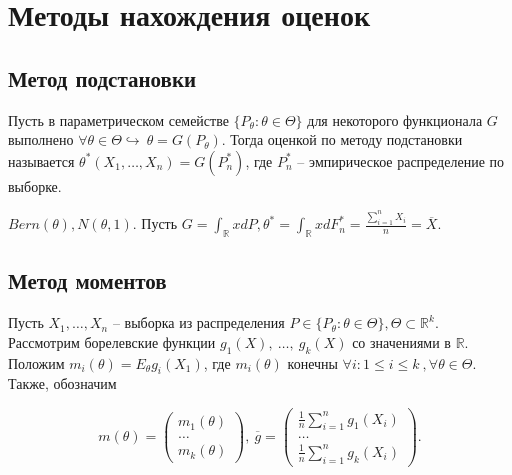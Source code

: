 \section{Методы нахождения оценок}
\subsection{Метод подстановки}
\begin{definition}
Пусть в параметрическом семействе $\displaystyle \{P_{\theta } :\theta \in \Theta \}$ для некоторого функционала $\displaystyle G$ выполнено $\displaystyle \forall \theta \in \Theta \hookrightarrow \ \theta =G( P_{\theta })$. Тогда оценкой по методу подстановки называется $\displaystyle \theta ^{*}( X_{1} ,\dotsc ,X_{n}) =G\left( P_{n}^{*}\right)$, где $\displaystyle P_{n}^{*}$ -- эмпирическое распределение по выборке.
\end{definition}
\begin{example}
$\displaystyle Bern( \theta ) ,N( \theta ,1)$. Пусть $\displaystyle G=\int _{\mathbb{R}} xdP,\theta ^{*} =\int _{\mathbb{R}} xdF_{n}^{*} =\frac{\sum _{i=1}^{n} X_{i}}{n} =\overline{X}$.
\end{example}
\subsection{Метод моментов}

Пусть $\displaystyle X_{1} ,\dotsc ,X_{n}$ -- выборка из распределения $\displaystyle P\in \{P_{\theta } :\theta \in \Theta \} ,\Theta \subset \mathbb{R}^{k}$. Рассмотрим борелевские функции $\displaystyle g_{1}( X) ,\ \dotsc ,\ g_{k}( X)$ со значениями в $\displaystyle \mathbb{R}$. Положим $\displaystyle m_{i}( \theta ) =E_{\theta } g_{i}( X_{1})$, где $\displaystyle m_{i}( \theta )$ конечны $\displaystyle \forall i:1\leqslant i\leqslant k\ ,\forall \theta \in \Theta $. Также, обозначим


\begin{equation*}
m( \theta ) =\begin{pmatrix}
m_{1}( \theta )\\
\dotsc \\
m_{k}( \theta )
\end{pmatrix} ,\ \overline{g} =\begin{pmatrix}
\frac{1}{n}\sum _{i=1}^{n} g_{1}( X_{i})\\
\dotsc \\
\frac{1}{n}\sum _{i=1}^{n} g_{k}( X_{i})
\end{pmatrix} .
\end{equation*}

